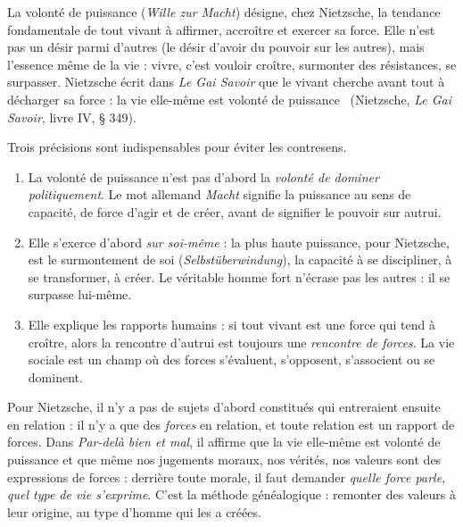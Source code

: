 \documentclass[11pt]{article}
\newcommand{\cle}[1]{{\popxbold\color{popdark}#1}}
\begin{document}
\begin{definition}
La \cle{volonté de puissance} (\emph{Wille zur Macht}) désigne, chez Nietzsche, la tendance fondamentale de tout vivant à affirmer, accroître et exercer sa force. Elle n'est pas un désir parmi d'autres (le désir d'avoir du pouvoir sur les autres), mais l'essence même de la vie : vivre, c'est vouloir croître, surmonter des résistances, se surpasser. Nietzsche écrit dans \emph{Le Gai Savoir} que le vivant \guillemotleft cherche avant tout à décharger sa force : la vie elle-même est volonté de puissance \guillemotright\ (Nietzsche, \emph{Le Gai Savoir}, livre IV, § 349).
\end{definition}

Trois précisions sont indispensables pour éviter les contresens.

\begin{enumerate}
\item La volonté de puissance n'est pas d'abord la \emph{volonté de dominer politiquement}. Le mot allemand \emph{Macht} signifie la puissance au sens de capacité, de force d'agir et de créer, avant de signifier le pouvoir sur autrui.
\item Elle s'exerce d'abord \emph{sur soi-même} : la plus haute puissance, pour Nietzsche, est le \cle{surmontement de soi} (\emph{Selbstüberwindung}), la capacité à se discipliner, à se transformer, à créer. Le véritable homme fort n'écrase pas les autres : il se surpasse lui-même.
\item Elle explique les rapports humains : si tout vivant est une force qui tend à croître, alors la rencontre d'autrui est toujours une \emph{rencontre de forces}. La vie sociale est un champ où des forces s'évaluent, s'opposent, s'associent ou se dominent.
\end{enumerate}

\begin{propriete}
Pour Nietzsche, il n'y a pas de sujets d'abord constitués qui entreraient ensuite en relation : il n'y a que des \emph{forces} en relation, et toute relation est un rapport de forces. Dans \emph{Par-delà bien et mal}, il affirme que la vie elle-même est volonté de puissance et que même nos jugements moraux, nos vérités, nos valeurs sont des expressions de forces : derrière toute morale, il faut demander \emph{quelle force parle}, \emph{quel type de vie s'exprime}. C'est la méthode \cle{généalogique} : remonter des valeurs à leur origine, au type d'homme qui les a créées.
\end{propriete}
\end{document}
